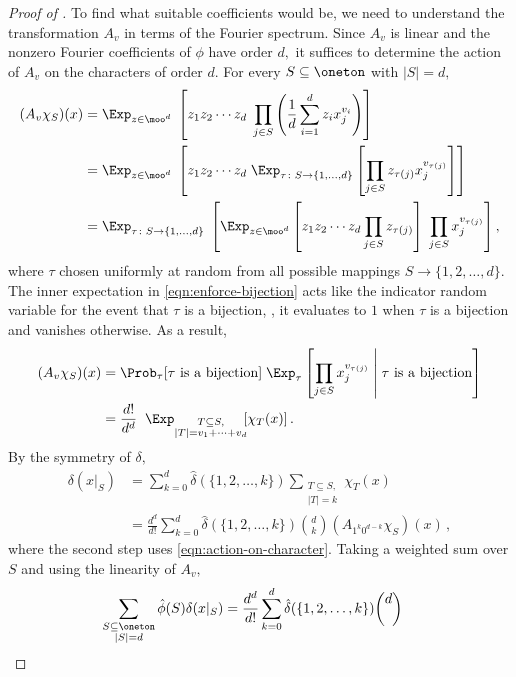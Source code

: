 \begin{proof}[Proof of ]
To find what suitable coefficients would be, we need to
understand the transformation $A_v$ in terms of the Fourier
spectrum. Since $A_v$ is linear and the nonzero
Fourier coefficients of $\phi$ have order $d,$ it
suffices to determine the action of $A_v$ on the
characters of order $d$. For every $S\subseteq\oneton$
with $|S|=d,$ 
\begin{align}
(A_v\chi_S)(x)
 &= 
\Exp_{z\in\moo^d} \;
\left[z_1z_2\cdots z_d \;\prod_{j\in S}\left(\frac1d\sum_{i=1}^d
z_{i}x_j^{v_i}\right)\right] \nonumber\\
&= 
\Exp_{z\in\moo^d} \;
\left[z_1z_2\cdots z_d \;\Exp_{\tau\colon S\to\{1,\dots,d\}}
\left[\prod_{j\in S}
z_{\tau(j)}x_j^{v_{\tau(j)}}\right]\right] \nonumber\\
&= \Exp_{\tau\colon S\to\{1,\dots,d\}} \;
\left[
\Exp_{z\in\moo^d}\left[z_1z_2\cdots z_d\prod_{j\in S} 
z_{\tau(j)}\right]
\;\prod_{j\in S} x_j^{v_{\tau(j)}}
\right],
\label{eqn:enforce-bijection}
\end{align}
where $\tau$ chosen uniformly at random from all
possible mappings $S\to\{1,2,\dots,d\}$. 
The inner expectation in \eqref{eqn:enforce-bijection} acts like the
indicator random variable for the event that $\tau$ is
a bijection, \ie, it evaluates to $1$ when $\tau$ is a
bijection and vanishes otherwise. As a result,
\begin{align}
(A_v\chi_S)(x)
&= \Prob_\tau [\text{$\tau$ is a bijection}]\;
\Exp_\tau \left[\prod_{j\in S} x_j^{v_{\tau(j)}}
\;\middle|\;  \text{$\tau$ is a bijection}\right]\nonumber\\
 &= 
\frac{d!}{d^d}\;\;
\Exp_{\substack{T\subseteq
S,\\|T|=v_1+\cdots+v_d}}\!\![\chi_T(x)]\,.
\label{eqn:action-on-character}
\end{align}
By the symmetry of $\delta,$ 
\begin{align*}
\delta(x|_S) &= \sum_{k=0}^d \hat\delta(\{1,2,\dots,k\}) \sum_{\substack{T\subseteq
 S,\\|T|=k}}\chi_T(x)\\
 &= \frac{d^d}{d!}\sum_{k=0}^d \hat\delta(\{1,2,\dots,k\}) {d\choose
 k}
 (A_{1^k0^{d-k}}\chi_S)(x)\,,
\end{align*}
where the second step uses
\eqref{eqn:action-on-character}. Taking a weighted sum over $S$ and using the
linearity of $A_v,$ 
\begin{align*}
\sum_{\substack{S\subseteq\oneton\\|S|=d}}
\hat\phi(S)\delta(x|_S) &= 
 \frac{d^d}{d!}\sum_{k=0}^d \hat\delta(\{1,2,\dots,k\}) {d\choose
}
\end{align*}
\end{proof}
